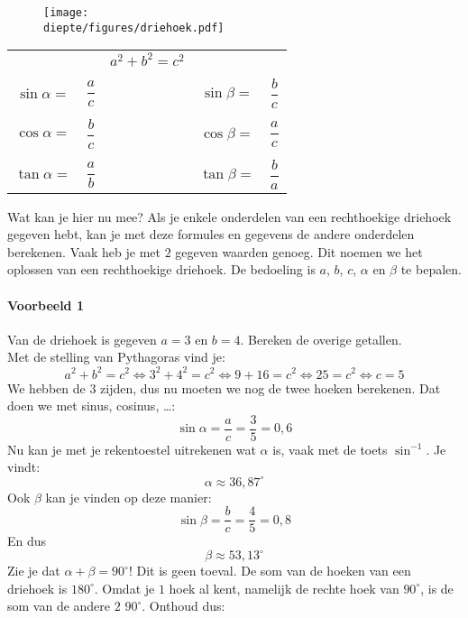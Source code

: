 \documentclass[a4paper,12pt]{article}
\newcommand{\diepte}{./}
\begin{document}
\begin{figure}[h]
\begin{center}
\texttt{[image: \\diepte/figures/driehoek.pdf]}
\end{center}
\end{figure}

\begin{framed}
\begin{center}
\begin{tabular}{ccccc}
&&$a^2+b^2=c^2$ &&\\
&&&&\\
$\sin \alpha=$ & $\dfrac{a}{c}$ &\qquad\qquad\qquad & $\sin \beta=$ & $\dfrac{b}{c}$\\
&&&&\\
$\cos \alpha=$ & $\dfrac{b}{c}$ &\qquad\qquad\qquad & $\cos \beta=$ & $\dfrac{a}{c}$\\
&&&&\\
$\tan \alpha=$ & $\dfrac{a}{b}$ &\qquad\qquad\qquad & $\tan \beta=$ & $\dfrac{b}{a}$\\
\end{tabular}
\end{center}
\end{framed}

Wat kan je hier nu mee? Als je enkele onderdelen van een rechthoekige driehoek gegeven hebt, kan je met deze formules en gegevens de andere onderdelen berekenen. Vaak heb je met $2$ gegeven waarden genoeg. Dit noemen we het oplossen van een rechthoekige driehoek. De bedoeling is $a$, $b$, $c$, $\alpha$ en $\beta$ te bepalen.

\paragraph{Voorbeeld 1} Van de driehoek is gegeven $a = 3$ en $b = 4$. Bereken de overige getallen.\\
Met de stelling van Pythagoras vind je:
\[a^2+b^2=c^2 \Leftrightarrow 3^2+4^2=c^2 \Leftrightarrow 9+16=c^2 \Leftrightarrow 25=c^2 \Leftrightarrow c=5\]
We hebben de $3$ zijden, dus nu moeten we nog de twee hoeken berekenen. Dat doen we met sinus, cosinus, \ldots:
\[\sin \alpha = \frac{a}{c} = \frac{3}{5} = 0,6\]
Nu kan je met je rekentoestel uitrekenen wat $\alpha$ is, vaak met de toets $\sin^{-1}$. Je vindt:
\[\alpha \approx 36,87^\circ\]
Ook $\beta$ kan je vinden op deze manier:
\[\sin \beta = \frac{b}{c}=\frac{4}{5}=0,8\]
En dus
\[\beta \approx 53,13^\circ\]
Zie je dat $\alpha+\beta = 90^\circ$! Dit is geen toeval. De som van de hoeken van een driehoek is $180^\circ$. Omdat je $1$ hoek al kent, namelijk de rechte hoek van $90^\circ$, is de som van de andere $2$ $90^\circ$. Onthoud dus:
\end{document}
